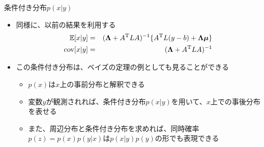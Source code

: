 \begin{frame}{条件付き分布$p(x|y)$}
 \begin{itemize}
  \item 同様に、以前の結果を利用する
        \begin{eqnarray}
         \mathbb{E}[x|y]& =& (\bm{\Lambda}+A^{\mathrm{T}}LA)^{-1}\{A^{\mathrm{T}}L(y-b)+\bm{\Lambda}\bm{\mu}\}\\
         {\rm cov}[x|y] &= & (\bm{\Lambda}+A^{\mathrm{T}}LA)^{-1}
        \end{eqnarray}
  \item この条件付き分布は、ベイズの定理の例としても見ることができる
        \begin{itemize}
         \item $p(x)$は$x$上の事前分布と解釈できる
         \item 変数$y$が観測されれば、条件付き分布$p(x|y)$を用いて、$x$上での事後分布を表せる
         \item また、周辺分布と条件付き分布を求めれば、同時確率$p(z)=p(x)p(y|x)$は$p(x|y)p(y)$の形でも表現できる
        \end{itemize}
 \end{itemize}

\end{frame}
